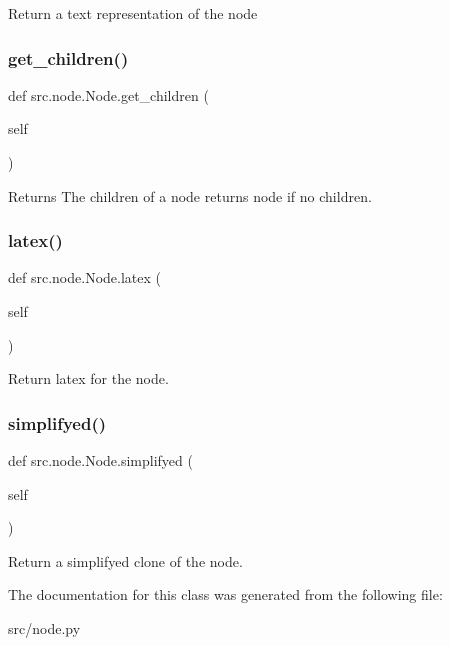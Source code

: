 \begin{DoxyVerb}Return a text representation of the node
\end{DoxyVerb}
 \mbox{\label{classsrc_1_1node_1_1Node_a756ae69f487fdee0a12e5f462d805c3e}} 
\subsubsection{\texorpdfstring{get\+\_\+children()}{get\_children()}}
{\footnotesize\ttfamily def src.\+node.\+Node.\+get\+\_\+children (\begin{DoxyParamCaption}\item[{}]{self }\end{DoxyParamCaption})}

\begin{DoxyVerb}Returns The children of a node returns node if no children.
\end{DoxyVerb}
 \mbox{\label{classsrc_1_1node_1_1Node_a96e5e408dd0bcca509adb992b3896010}} 
\subsubsection{\texorpdfstring{latex()}{latex()}}
{\footnotesize\ttfamily def src.\+node.\+Node.\+latex (\begin{DoxyParamCaption}\item[{}]{self }\end{DoxyParamCaption})}

\begin{DoxyVerb}Return latex for the node.
\end{DoxyVerb}
 \mbox{\label{classsrc_1_1node_1_1Node_a78a051abb54de2b49a557c780d53c05b}} 
\subsubsection{\texorpdfstring{simplifyed()}{simplifyed()}}
{\footnotesize\ttfamily def src.\+node.\+Node.\+simplifyed (\begin{DoxyParamCaption}\item[{}]{self }\end{DoxyParamCaption})}

\begin{DoxyVerb}Return a simplifyed clone of the node.
\end{DoxyVerb}
 

The documentation for this class was generated from the following file\+:\begin{DoxyCompactItemize}
\item 
src/node.\+py\end{DoxyCompactItemize}
